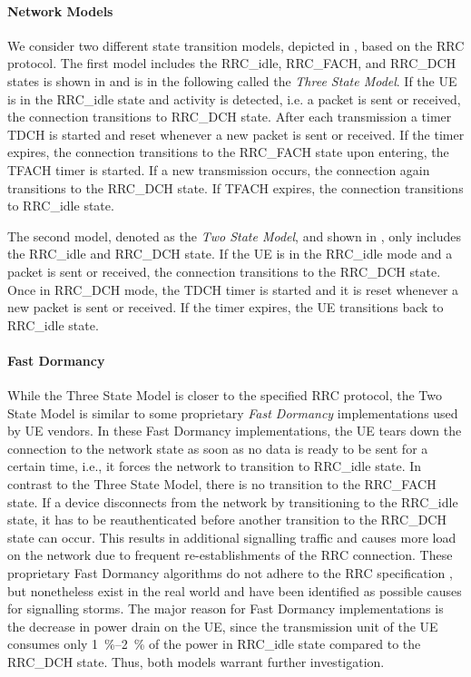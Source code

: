\paragraph*{Network Models} We consider two different state transition models, depicted in , based on the \gls{RRC} protocol.
The first model includes the \gls{RRC_idle}, \gls{RRC_FACH}, and \gls{RRC_DCH} states is shown in  and is in the following called the \emph{Three State Model}.
If the \gls{UE} is in the \gls{RRC_idle} state and activity is detected, i.e. a packet is sent or received, the connection transitions to \gls{RRC_DCH} state.
After each transmission a timer \gls{TDCH} is started and reset whenever a new packet is sent or received.
If the timer expires, the connection transitions to the \gls{RRC_FACH} state upon entering, the \gls{TFACH} timer is started.
If a new transmission occurs, the connection again transitions to the \gls{RRC_DCH} state.
If \gls{TFACH} expires, the connection transitions to \gls{RRC_idle} state.

The second model, denoted as the \emph{Two State Model}, and shown in , only includes the \gls{RRC_idle} and \gls{RRC_DCH} state.
If the \gls{UE} is in the \gls{RRC_idle} mode and a packet is sent or received, the connection transitions to the \gls{RRC_DCH} state. Once in \gls{RRC_DCH} mode, the \gls{TDCH} timer is started and it is reset whenever a new packet is sent or received.
If the timer expires, the \gls{UE} transitions back to \gls{RRC_idle} state.

\paragraph*{Fast Dormancy} While the Three State Model is closer to the specified \gls{RRC} protocol, the Two State Model is similar to some proprietary \emph{Fast Dormancy} implementations used by \gls{UE} vendors.
In these Fast Dormancy implementations, the \gls{UE} tears down the connection to the network state as soon as no data is ready to be sent for a certain time, i.e., it forces the network to transition to \gls{RRC_idle} state.
In contrast to the Three State Model, there is no transition to the \gls{RRC_FACH} state.
If a device disconnects from the network by transitioning to the \gls{RRC_idle} state, it has to be reauthenticated before another transition to the \gls{RRC_DCH} state can occur.
This results in additional signalling traffic and causes more load on the network \cite{NSN2011} due to frequent re-establishments of the RRC connection.
These proprietary Fast Dormancy algorithms do not adhere to the \gls{RRC} specification \cite{GSM2010}, but nonetheless exist in the real world and have been identified as possible causes for signalling storms.
The major reason for Fast Dormancy implementations is the decrease in power drain on the \gls{UE}, since the transmission unit of the \gls{UE} consumes only \SIrange{1}{2}{\percent} of the power in \gls{RRC_idle} state compared to the \gls{RRC_DCH} state.
Thus, both models warrant further investigation.

